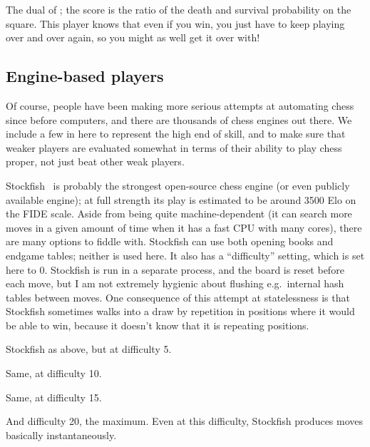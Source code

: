 \documentclass[10pt,preprint,twocolumn]{acmart}
\begin{document}
 The dual of ; the score is
the ratio of the death and survival probability on the square. This
player knows that even if you win, you just have to keep playing over
and over again, so you might as well get it over with! \stateful

\subsection{Engine-based players}

Of course, people have been making more serious attempts at automating
chess since before computers, and there are thousands of chess engines
out there. We include a few in here to represent the high end of
skill, and to make sure that weaker players are evaluated somewhat in
terms of their ability to play chess proper, not just beat other weak
players.

 Stockfish~\cite{stockfish} is probably the
strongest open-source chess engine (or even publicly available
engine); at full strength its play is estimated to be around 3500 Elo
on the FIDE scale. Aside from being quite machine-dependent (it can
search more moves in a given amount of time when it has a fast CPU
with many cores), there are many options to fiddle with. Stockfish can
use both opening books and endgame tables; neither is used here. It
also has a ``difficulty'' setting, which is set here to 0. Stockfish
is run in a separate process, and the board is reset before each move,
but I am not extremely hygienic about flushing e.g.~internal hash
tables between moves. One consequence of this attempt at statelessness
is that Stockfish sometimes walks into a draw by repetition in
positions where it would be able to win, because it doesn't know that
it is repeating positions. \traditional

 Stockfish as above, but at difficulty 5.
\traditional

 Same, at difficulty 10.
\traditional

 Same, at difficulty 15.
\traditional

 And difficulty 20, the maximum. Even
at this difficulty, Stockfish produces moves basically instantaneously.
\traditional
\end{document}
